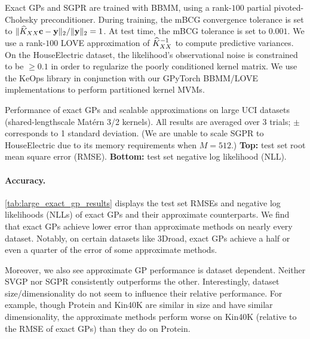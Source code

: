 Exact GPs and SGPR are trained with BBMM, using a rank-$100$ partial pivoted-Cholesky preconditioner.
During training, the mBCG convergence tolerance is set to  $\Vert \widehat{K}_{XX} \mathbf{c} - \mathbf{y} \Vert_2 / \Vert \mathbf{y} \Vert_2 = 1$.
At test time, the mBCG tolerance is set to $0.001$.
We use a rank-$100$ LOVE approximation of $\widehat{K}_{XX}^{-1}$ to compute predictive variances.
On the HouseElectric dataset, the likelihood's observational noise is constrained to be $\geq 0.1$ in order to regularize the poorly conditioned kernel matrix.
We use the KeOps library \cite{charlier2020kernel} in conjunction with our GPyTorch BBMM/LOVE implementations to perform partitioned kernel MVMs.

\begin{table}[!tb]
  \caption[Performance of exact GPs and scalable approximations on large UCI datasets.]{
    Performance of exact GPs and scalable approximations on large UCI datasets (shared-lengthscale Mat\'ern 3/2 kernels).
    All results are averaged over 3 trials; $\pm$ corresponds to 1 standard deviation.
    (We are unable to scale SGPR to HouseElectric due to its memory requirements when $M=512$.)
    {\bf Top:} test set root mean square error (RMSE).
    {\bf Bottom:} test set negative log likelihood (NLL).
  }
  \label{tab:large_exact_gp_results}
  \centering
  \vspace{1em}

  \resizebox{\textwidth}{!}{%
    
  }
  \vspace{1em}

  \resizebox{\textwidth}{!}{%
    
  }
  \vspace{1em}
\end{table}

\paragraph{Accuracy.}
\cref{tab:large_exact_gp_results} displays the test set RMSEs and negative log likelihoods (NLLs) of exact GPs and their approximate counterparts.
We find that exact GPs achieve lower error than approximate methods on nearly every dataset.
Notably, on certain datasets like 3Droad, exact GPs achieve a half or even a quarter of the error of some approximate methods.

Moreover, we also see approximate GP performance is dataset dependent.
Neither SVGP nor SGPR consistently outperforms the other.
Interestingly, dataset size/dimensionality do not seem to influence their relative performance.
For example, though Protein and Kin40K are similar in size and have similar dimensionality, the approximate methods perform worse on Kin40K (relative to the RMSE of exact GPs) than they do on Protein.


